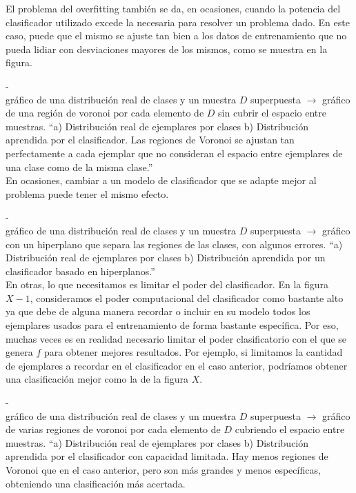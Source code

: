 El problema del overfitting también se da, en ocasiones, cuando la potencia del clasificador utilizado excede la necesaria para resolver un problema dado. En este caso, puede que el mismo se ajuste tan bien a los datos de entrenamiento que no pueda lidiar con desviaciones mayores de los mismos, como se muestra en la figura.

-\\gráfico de una distribución real de clases y un muestra $D$ superpuesta $\rightarrow$ gráfico de una región de voronoi por cada elemento de $D$ sin cubrir el espacio entre muestras.
``a) Distribución real de ejemplares por clases b) Distribución aprendida por el clasificador. Las regiones de Voronoi se ajustan tan perfectamente a cada ejemplar que no consideran el espacio entre ejemplares de una clase como de la misma clase.''\\


En ocasiones, cambiar a un modelo de clasificador que se adapte mejor al problema puede tener el mismo efecto.

-\\gráfico de una distribución real de clases y un muestra $D$ superpuesta $\rightarrow$ gráfico con un hiperplano que separa las regiones de las clases, con algunos errores.
``a) Distribución real de ejemplares por clases b) Distribución aprendida por un clasificador basado en hiperplanos.''\\


En otras, lo que necesitamos es limitar el poder del clasificador. En la figura $X-1$, consideramos el poder computacional del clasificador como bastante alto ya que debe de alguna manera recordar o incluir en su modelo todos los ejemplares usados para el entrenamiento de forma bastante específica. Por eso, muchas veces es en realidad necesario limitar el poder clasificatorio con el que se genera $f$ para obtener mejores resultados. Por ejemplo, si limitamos la cantidad de ejemplares a recordar en el clasificador en el caso anterior, podríamos obtener una clasificación mejor como la de la figura $X$.

-\\gráfico de una distribución real de clases y un muestra $D$ superpuesta $\rightarrow$ gráfico de varias regiones de voronoi por cada elemento de $D$ cubriendo el espacio entre muestras.
``a) Distribución real de ejemplares por clases b) Distribución aprendida por el clasificador con capacidad limitada. Hay menos regiones de Voronoi que en el caso anterior, pero son más grandes y menos específicas, obteniendo una clasificación más acertada.\\

